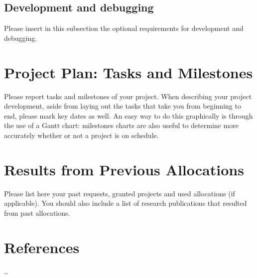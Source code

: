 \documentclass[11pt]{article}
\begin{document}
\subsection{Development and debugging}
Please insert in this subsection the optional requirements for development and debugging. 

\section{Project Plan: Tasks and Milestones}
Please report tasks and milestones of your project. When describing your project development, 
aside from laying out the tasks that take you from beginning to end, please mark key dates as well.  
An easy way to do this graphically is through the use of a Gantt chart: milestones charts  
are also useful to determine more accurately whether or not a project is on schedule. 

\section{Results from Previous Allocations}
Please list here your past requests, granted projects and used allocations (if applicable). 
You should also include a list of research publications that resulted from past allocations.

\section*{References}
\ldots


\end{document}
